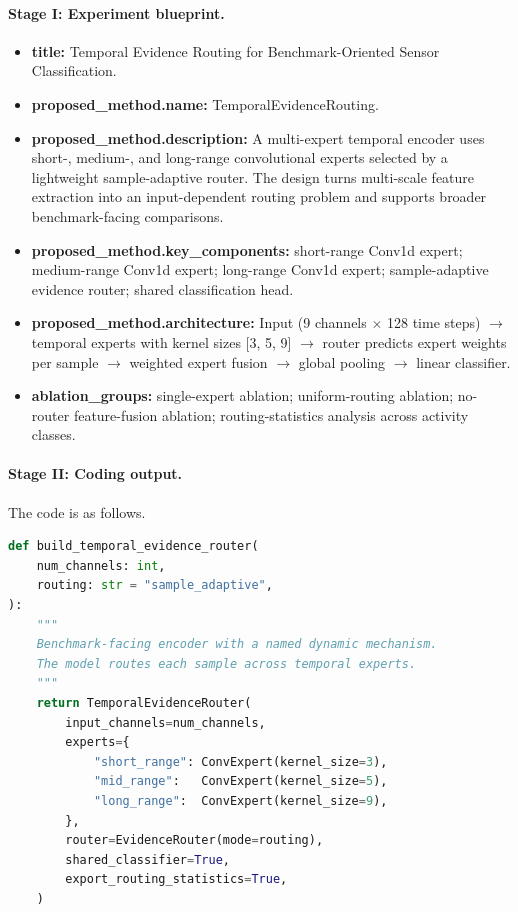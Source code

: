 \documentclass{opendatalab}
\begin{document}
\paragraph{Stage I: Experiment blueprint.}
\begin{itemize}\setlength\itemsep{1pt}
  \item \textbf{title:} Temporal Evidence Routing for Benchmark-Oriented
  Sensor Classification.
  \item \textbf{proposed\_method.name:} TemporalEvidenceRouting.
  \item \textbf{proposed\_method.description:} A multi-expert temporal
  encoder uses short-, medium-, and long-range convolutional experts
  selected by a lightweight sample-adaptive router. The design turns
  multi-scale feature extraction into an input-dependent routing problem
  and supports broader benchmark-facing comparisons.
  \item \textbf{proposed\_method.key\_components:} short-range Conv1d
  expert; medium-range Conv1d expert; long-range Conv1d expert;
  sample-adaptive evidence router; shared classification head.
  \item \textbf{proposed\_method.architecture:} Input (9 channels $\times$
  128 time steps) $\rightarrow$ temporal experts with kernel sizes
  [3, 5, 9] $\rightarrow$ router predicts expert weights per sample
  $\rightarrow$ weighted expert fusion $\rightarrow$ global pooling
  $\rightarrow$ linear classifier.
  \item \textbf{ablation\_groups:} single-expert ablation; uniform-routing
  ablation; no-router feature-fusion ablation; routing-statistics
  analysis across activity classes.
\end{itemize}

\paragraph{Stage II: Coding output.}
The code is as follows.

\begin{lstlisting}[language=Python,
                   basicstyle=\ttfamily\small,
                   columns=fullflexible,
                   keepspaces=true,
                   showspaces=false,
                   showstringspaces=false,
                   breaklines=true]
def build_temporal_evidence_router(
    num_channels: int,
    routing: str = "sample_adaptive",
):
    """
    Benchmark-facing encoder with a named dynamic mechanism.
    The model routes each sample across temporal experts.
    """
    return TemporalEvidenceRouter(
        input_channels=num_channels,
        experts={
            "short_range": ConvExpert(kernel_size=3),
            "mid_range":   ConvExpert(kernel_size=5),
            "long_range":  ConvExpert(kernel_size=9),
        },
        router=EvidenceRouter(mode=routing),
        shared_classifier=True,
        export_routing_statistics=True,
    )
\end{lstlisting}
\end{document}
